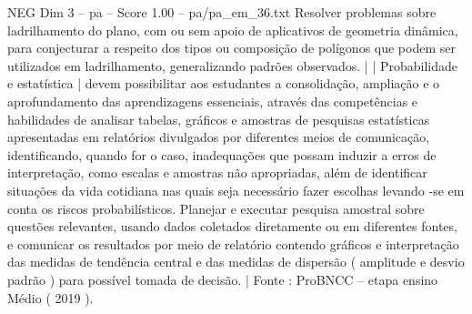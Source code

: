 \begin{textsample}{NEG Dim 3 – pa – Score 1.00 – pa/pa\_em\_36.txt}
Resolver problemas sobre ladrilhamento do plano, com ou sem apoio de aplicativos de geometria dinâmica, para conjecturar a respeito dos tipos ou composição de polígonos que podem ser utilizados em ladrilhamento, generalizando padrões observados. | | Probabilidade e estatística | devem possibilitar aos estudantes a consolidação, ampliação e o aprofundamento das aprendizagens essenciais, através das competências e habilidades de analisar tabelas, gráficos e amostras de pesquisas estatísticas apresentadas em relatórios divulgados por diferentes meios de comunicação, identificando, quando for o caso, inadequações que possam induzir a erros de interpretação, como escalas e amostras não apropriadas, além de identificar situações da vida cotidiana nas quais seja necessário fazer escolhas levando -se em conta os riscos probabilísticos.
Planejar e executar pesquisa amostral sobre questões relevantes, usando dados coletados diretamente ou em diferentes fontes, e comunicar os resultados por meio de relatório contendo gráficos e interpretação das medidas de tendência central e das medidas de dispersão ( amplitude e desvio padrão ) para possível tomada de decisão. | Fonte : ProBNCC – etapa ensino Médio ( 2019 ).

\end{textsample}
